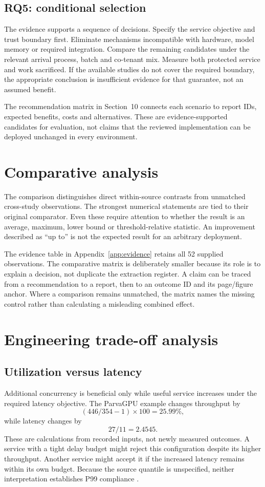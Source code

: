 \subsection{RQ5: conditional selection}
The evidence supports a sequence of decisions. Specify the service objective and trust boundary first. Eliminate mechanisms incompatible with hardware, model memory or required integration. Compare the remaining candidates under the relevant arrival process, batch and co-tenant mix. Measure both protected service and work sacrificed. If the available studies do not cover the required boundary, the appropriate conclusion is insufficient evidence for that guarantee, not an assumed benefit.

The recommendation matrix in Section~10 connects each scenario to report IDs, expected benefits, costs and alternatives. These are evidence-supported candidates for evaluation, not claims that the reviewed implementation can be deployed unchanged in every environment.

\section{Comparative analysis}
The comparison distinguishes direct within-source contrasts from unmatched cross-study observations. The strongest numerical statements are tied to their original comparator. Even these require attention to whether the result is an average, maximum, lower bound or threshold-relative statistic. An improvement described as ``up to'' is not the expected result for an arbitrary deployment.



The evidence table in Appendix~\ref{app:evidence} retains all 52 supplied observations. The comparative matrix is deliberately smaller because its role is to explain a decision, not duplicate the extraction register. A claim can be traced from a recommendation to a report, then to an outcome ID and its page/figure anchor. Where a comparison remains unmatched, the matrix names the missing control rather than calculating a misleading combined effect.

\section{Engineering trade-off analysis}
\subsection{Utilization versus latency}
Additional concurrency is beneficial only while useful service increases under the required latency objective. The ParvaGPU example changes throughput by
\[ (446/354-1)\times100 = 25.99\%, \]
while latency changes by
\[ 27/11 = 2.4545. \]
These are calculations from recorded inputs, not newly measured outcomes. A service with a tight delay budget might reject this configuration despite its higher throughput. Another service might accept it if the increased latency remains within its own budget. Because the source quantile is unspecified, neither interpretation establishes P99 compliance \cite{P011}.

